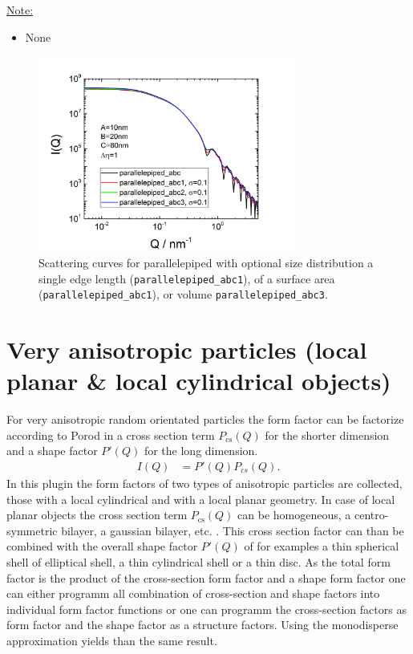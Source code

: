 \noindent\underline{Note:}
\begin{itemize}
\item None
\end{itemize}

\begin{figure}[htb]
\begin{center}
\includegraphics[width=0.75\textwidth]{../images/form_factor/anisotropic/parallelepipedABC.png}
\end{center}
\caption{Scattering curves for parallelepiped with optional size distribution a single edge length (\texttt{parallelepiped\_abc1}), of a surface area (\texttt{parallelepiped\_abc1}), or volume \texttt{parallelepiped\_abc3}.}
\label{fig:IQparallelepiped}
\end{figure}

\clearpage
\section{Very anisotropic particles (local planar \& local cylindrical objects)}
\label{sec:very_anisotropic_particles}
For very anisotropic random orientated particles the form factor
can be factorize according to Porod \cite{Porod1948} in a cross
section term $P_\text{cs}(Q)$ for the shorter dimension and a
shape factor $P'(Q)$ for the long dimension.
\begin{align}
I(Q) &=P'(Q) P_{cs}(Q).
\end{align}
In this plugin the form factors of two types of anisotropic
particles are collected, those with a local cylindrical and with a
local planar geometry. In case of local planar objects the cross
section term $P_\text{cs}(Q)$ can be homogeneous, a
centro-symmetric bilayer, a gaussian bilayer, etc. . This cross
section factor can than be combined with the overall shape factor
$P'(Q)$ of for examples a thin spherical shell of elliptical
shell, a thin cylindrical shell or a thin disc. As the total form
factor is the product of the cross-section form factor and a shape
form factor one can either programm all combination of
cross-section and shape factors into individual form factor
functions or one can programm the cross-section factors as form
factor and the shape factor as a structure factors. Using the
monodisperse approximation yields than the same result.

